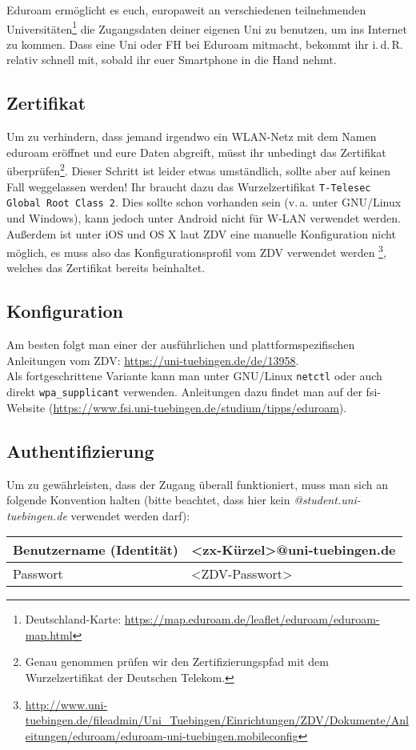Eduroam ermöglicht es euch, europaweit an verschiedenen teilnehmenden
Universitäten\footnote{Deutschland-Karte:
\url{https://map.eduroam.de/leaflet/eduroam/eduroam-map.html}} die Zugangsdaten
deiner eigenen Uni zu benutzen, um ins Internet zu kommen. Dass eine Uni oder
FH bei Eduroam mitmacht, bekommt ihr i.\,d.\,R. relativ schnell mit, sobald ihr
euer Smartphone in die Hand nehmt.

\vfill

\subsection*{Zertifikat}
  Um zu verhindern, dass jemand irgendwo ein WLAN-Netz mit dem Namen eduroam
  eröffnet und eure Daten abgreift, müsst ihr unbedingt das Zertifikat
  überprüfen\footnote{Genau genommen prüfen wir den Zertifizierungspfad mit dem
  Wurzelzertifikat der Deutschen Telekom.}. Dieser Schritt ist leider etwas
  umständlich, sollte aber auf keinen Fall weggelassen werden! Ihr braucht dazu das Wurzelzertifikat \glqq\texttt{T-Telesec Global Root Class 2}\grqq. Dies
  sollte schon vorhanden sein (v.\,a. unter GNU/Linux und Windows), kann
  jedoch unter Android nicht für W-LAN verwendet werden. Außerdem ist unter iOS
  und OS X laut ZDV eine manuelle Konfiguration nicht möglich, es muss also das
  Konfigurationsprofil vom ZDV verwendet werden
  \footnote{\url{http://www.uni-tuebingen.de/fileadmin/Uni_Tuebingen/Einrichtungen/ZDV/Dokumente/Anleitungen/eduroam/eduroam-uni-tuebingen.mobileconfig}},
  welches das Zertifikat bereits beinhaltet.

\subsection*{Konfiguration}
  Am besten folgt man einer der ausführlichen und plattformspezifischen
  Anleitungen vom ZDV:
  \url{https://uni-tuebingen.de/de/13958}.\\
  Als fortgeschrittene Variante kann man unter GNU/Linux \texttt{netctl} oder auch
  direkt \texttt{wpa\_supplicant} verwenden. Anleitungen dazu findet man auf der
  fsi-Website (\url{https://www.fsi.uni-tuebingen.de/studium/tipps/eduroam}).

\subsection*{Authentifizierung}
  Um zu gewährleisten, dass der Zugang überall funktioniert, muss man sich an
  folgende Konvention halten (bitte beachtet, dass hier kein
  \emph{@student.uni-tuebingen.de} verwendet werden darf): \medskip \\
  \begin{tabular}{l|l}
    Benutzername (Identität) & <zx-Kürzel>@uni-tuebingen.de \\ \hline
    Passwort                 & <ZDV-Passwort>
  \end{tabular}

\vfill
